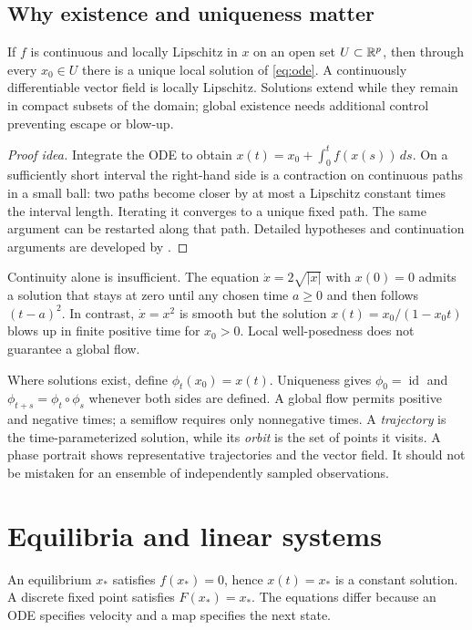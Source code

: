 \subsection{Why existence and uniqueness matter}
\begin{theorem}
If $f$ is continuous and locally Lipschitz in $x$ on an open set $U\subset\mathbb{R}^p$, then through every $x_0\in U$ there is a unique local solution of \eqref{eq:ode}. A continuously differentiable vector field is locally Lipschitz. Solutions extend while they remain in compact subsets of the domain; global existence needs additional control preventing escape or blow-up.
\end{theorem}
\begin{proof}[Proof idea]
Integrate the ODE to obtain $x(t)=x_0+\int_0^t f(x(s))\,ds$. On a sufficiently short interval the right-hand side is a contraction on continuous paths in a small ball: two paths become closer by at most a Lipschitz constant times the interval length. Iterating it converges to a unique fixed path. The same argument can be restarted along that path. Detailed hypotheses and continuation arguments are developed by \citet{teschl2012}.
\end{proof}

Continuity alone is insufficient. The equation $\dot x=2\sqrt{|x|}$ with $x(0)=0$ admits a solution that stays at zero until any chosen time $a\geq0$ and then follows $(t-a)^2$. In contrast, $\dot x=x^2$ is smooth but the solution $x(t)=x_0/(1-x_0t)$ blows up in finite positive time for $x_0>0$. Local well-posedness does not guarantee a global flow.

Where solutions exist, define $\phi_t(x_0)=x(t)$. Uniqueness gives $\phi_0=\operatorname{id}$ and $\phi_{t+s}=\phi_t\circ\phi_s$ whenever both sides are defined. A global flow permits positive and negative times; a semiflow requires only nonnegative times. A \emph{trajectory} is the time-parameterized solution, while its \emph{orbit} is the set of points it visits. A phase portrait shows representative trajectories and the vector field. It should not be mistaken for an ensemble of independently sampled observations.

\section{Equilibria and linear systems}
An equilibrium $x_*$ satisfies $f(x_*)=0$, hence $x(t)=x_*$ is a constant solution. A discrete fixed point satisfies $F(x_*)=x_*$. The equations differ because an ODE specifies velocity and a map specifies the next state.


